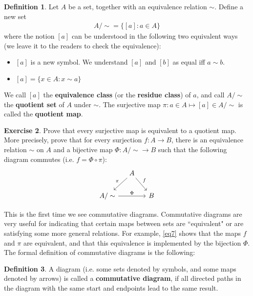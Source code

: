 \documentclass[12pt,b5paper,notitlepage]{article}
\theoremstyle{definition}
\newtheorem{df}{Definition}[section]
\newtheorem{exe}[df]{Exercise}
\theoremstyle{plain}
\numberwithin{equation}{section}
\begin{document}
\begin{df}\label{lb157}
Let $A$ be a set, together with an equivalence relation $\sim$. Define a new set
\begin{align*}
{A/\sim}=\{[a]: a\in A\}
\end{align*}
where the notion $[a]$ can be understood in the following two equivalent ways (we leave it to the readers to check the equivalence):
\begin{itemize}
\item[(1)] $[a]$ is a new symbol. We understand $[a]$ and $[b]$ as equal iff $a\sim b$.
\item[(2)] $[a]=\{x\in A: x\sim a \}$
\end{itemize}
We call $[a]$ the \textbf{equivalence class} (or the \textbf{residue class}) of $a$, and call $A/\sim$ the \textbf{quotient set}  of $A$ under $\sim$. The surjective map $\pi:a\in A\mapsto [a]\in {A/\sim}$ is called the \textbf{quotient map}.
\end{df}


\begin{exe}
Prove that every surjective map  is equivalent to a quotient map. More precisely, prove that for every surjection $f:A\rightarrow B$, there is an equivalence relation $\sim$ on $A$ and a bijective map $\Phi:{A/\sim}\rightarrow B$ such that the following diagram commutes (i.e. $f=\Phi\circ\pi$):
\begin{equation}\label{eq7}
\begin{tikzcd}[column sep=small]
                          & A \arrow[rd, "f"] \arrow[ld, "\pi"'] &   \\
{A/\sim} \arrow[rr, "\Phi"] &                                      & B
\end{tikzcd}
\end{equation}
\end{exe}


This is the first time we see commutative diagrams. Commutative diagrams are very useful for indicating that certain maps between sets are ``equivalent" or are satisfying some more general relations. For example, \eqref{eq7} shows that the maps $f$ and $\pi$ are equivalent, and that this equivalence is implemented by the bijection $\Phi$. The formal definition of commutative diagrams is the following:


\begin{df}
A diagram (i.e. some sets denoted by symbols, and some maps denoted by arrows) is called a \textbf{commutative diagram},  if all directed paths in the diagram with the same start and endpoints lead to the same result.
\end{df}
\end{document}
